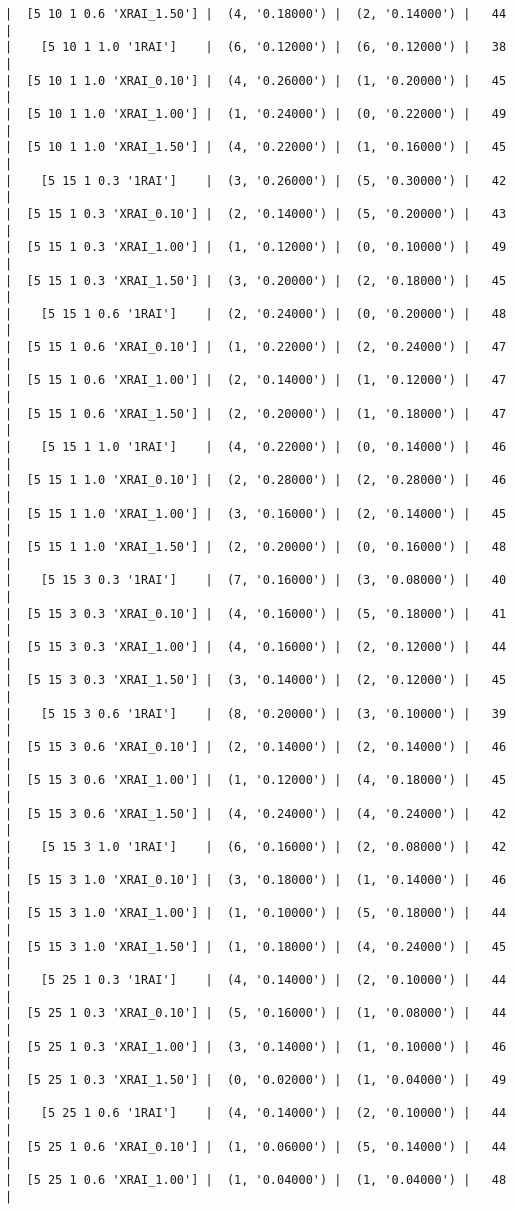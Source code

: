 \documentclass{article}
\begin{document}
\begin{verbatim}
|  [5 10 1 0.6 'XRAI_1.50'] |  (4, '0.18000') |  (2, '0.14000') |   44  |
|    [5 10 1 1.0 '1RAI']    |  (6, '0.12000') |  (6, '0.12000') |   38  |
|  [5 10 1 1.0 'XRAI_0.10'] |  (4, '0.26000') |  (1, '0.20000') |   45  |
|  [5 10 1 1.0 'XRAI_1.00'] |  (1, '0.24000') |  (0, '0.22000') |   49  |
|  [5 10 1 1.0 'XRAI_1.50'] |  (4, '0.22000') |  (1, '0.16000') |   45  |
|    [5 15 1 0.3 '1RAI']    |  (3, '0.26000') |  (5, '0.30000') |   42  |
|  [5 15 1 0.3 'XRAI_0.10'] |  (2, '0.14000') |  (5, '0.20000') |   43  |
|  [5 15 1 0.3 'XRAI_1.00'] |  (1, '0.12000') |  (0, '0.10000') |   49  |
|  [5 15 1 0.3 'XRAI_1.50'] |  (3, '0.20000') |  (2, '0.18000') |   45  |
|    [5 15 1 0.6 '1RAI']    |  (2, '0.24000') |  (0, '0.20000') |   48  |
|  [5 15 1 0.6 'XRAI_0.10'] |  (1, '0.22000') |  (2, '0.24000') |   47  |
|  [5 15 1 0.6 'XRAI_1.00'] |  (2, '0.14000') |  (1, '0.12000') |   47  |
|  [5 15 1 0.6 'XRAI_1.50'] |  (2, '0.20000') |  (1, '0.18000') |   47  |
|    [5 15 1 1.0 '1RAI']    |  (4, '0.22000') |  (0, '0.14000') |   46  |
|  [5 15 1 1.0 'XRAI_0.10'] |  (2, '0.28000') |  (2, '0.28000') |   46  |
|  [5 15 1 1.0 'XRAI_1.00'] |  (3, '0.16000') |  (2, '0.14000') |   45  |
|  [5 15 1 1.0 'XRAI_1.50'] |  (2, '0.20000') |  (0, '0.16000') |   48  |
|    [5 15 3 0.3 '1RAI']    |  (7, '0.16000') |  (3, '0.08000') |   40  |
|  [5 15 3 0.3 'XRAI_0.10'] |  (4, '0.16000') |  (5, '0.18000') |   41  |
|  [5 15 3 0.3 'XRAI_1.00'] |  (4, '0.16000') |  (2, '0.12000') |   44  |
|  [5 15 3 0.3 'XRAI_1.50'] |  (3, '0.14000') |  (2, '0.12000') |   45  |
|    [5 15 3 0.6 '1RAI']    |  (8, '0.20000') |  (3, '0.10000') |   39  |
|  [5 15 3 0.6 'XRAI_0.10'] |  (2, '0.14000') |  (2, '0.14000') |   46  |
|  [5 15 3 0.6 'XRAI_1.00'] |  (1, '0.12000') |  (4, '0.18000') |   45  |
|  [5 15 3 0.6 'XRAI_1.50'] |  (4, '0.24000') |  (4, '0.24000') |   42  |
|    [5 15 3 1.0 '1RAI']    |  (6, '0.16000') |  (2, '0.08000') |   42  |
|  [5 15 3 1.0 'XRAI_0.10'] |  (3, '0.18000') |  (1, '0.14000') |   46  |
|  [5 15 3 1.0 'XRAI_1.00'] |  (1, '0.10000') |  (5, '0.18000') |   44  |
|  [5 15 3 1.0 'XRAI_1.50'] |  (1, '0.18000') |  (4, '0.24000') |   45  |
|    [5 25 1 0.3 '1RAI']    |  (4, '0.14000') |  (2, '0.10000') |   44  |
|  [5 25 1 0.3 'XRAI_0.10'] |  (5, '0.16000') |  (1, '0.08000') |   44  |
|  [5 25 1 0.3 'XRAI_1.00'] |  (3, '0.14000') |  (1, '0.10000') |   46  |
|  [5 25 1 0.3 'XRAI_1.50'] |  (0, '0.02000') |  (1, '0.04000') |   49  |
|    [5 25 1 0.6 '1RAI']    |  (4, '0.14000') |  (2, '0.10000') |   44  |
|  [5 25 1 0.6 'XRAI_0.10'] |  (1, '0.06000') |  (5, '0.14000') |   44  |
|  [5 25 1 0.6 'XRAI_1.00'] |  (1, '0.04000') |  (1, '0.04000') |   48  |

\end{verbatim}
\end{document}
